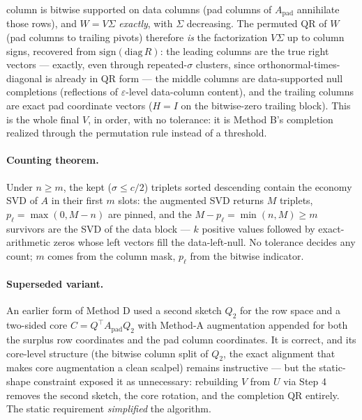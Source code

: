 \documentclass[11pt]{article}
\newcommand{\Apad}{A_{\mathrm{pad}}}
\begin{document}
\begin{enumerate}[label=\textbf{Step \arabic*.}, leftmargin=2.2cm, itemsep=3pt]
        column is bitwise supported on data columns (pad columns of $\Apad$
        annihilate those rows), and $W = V\Sigma$ \emph{exactly}, with
        $\Sigma$ decreasing. The permuted QR of $W$ (pad columns to trailing
        pivots) therefore \emph{is} the factorization $V\Sigma$ up to column
        signs, recovered from $\mathrm{sign}(\mathrm{diag}\,R)$: the leading
        columns are the true right vectors --- exactly, even through
        repeated-$\sigma$ clusters, since orthonormal-times-diagonal is
        already in QR form --- the middle columns are data-supported null
        completions (reflections of $\varepsilon$-level data-column content),
        and the trailing columns are exact pad coordinate vectors ($H = I$ on
        the bitwise-zero trailing block). This is the whole final $V$, in
        order, with no tolerance: it is Method B's completion realized
        through the permutation rule instead of a threshold.
\end{enumerate}

\paragraph{Counting theorem.} Under $n \ge m$, the kept ($\sigma \le c/2$)
triplets sorted descending contain the economy SVD of $A$ in their first $m$
slots: the augmented SVD returns $M$ triplets, $p_\ell = \max(0, M-n)$ are
pinned, and the $M - p_\ell = \min(n, M) \ge m$ survivors are the SVD of the
data block --- $k$ positive values followed by exact-arithmetic zeros whose
left vectors fill the data-left-null. No tolerance decides any count; $m$
comes from the column mask, $p_\ell$ from the bitwise indicator.

\paragraph{Superseded variant.} An earlier form of Method D used a second
sketch $Q_2$ for the row space and a two-sided core
$C = Q^{\top}\Apad Q_2$ with Method-A augmentation appended for both the
surplus row coordinates and the pad column coordinates. It is correct, and
its core-level structure (the bitwise column split of $Q_2$, the exact
alignment that makes core augmentation a clean scalpel) remains instructive
--- but the static-shape constraint exposed it as unnecessary: rebuilding $V$
from $U$ via Step 4 removes the second sketch, the core rotation, and the
completion QR entirely. The static requirement \emph{simplified} the
algorithm.
\end{document}
